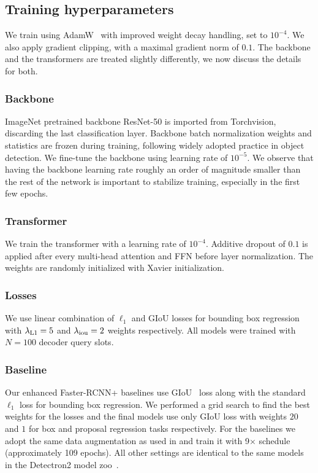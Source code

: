 \subsection{Training hyperparameters}
\label{sec:hyperparameters}
We train \detr using AdamW~\cite{Loshchilov2017DecoupledWD} with improved weight
decay handling, set to $10^{-4}$.
We also apply gradient clipping, with a maximal gradient norm of $0.1$.
The backbone and the transformers are treated slightly differently, we now discuss the details for both.
\subsubsection{Backbone}
ImageNet pretrained backbone ResNet-50 is imported from Torchvision, discarding the last classification layer.
Backbone batch normalization weights and statistics are frozen during training,
following widely adopted practice in object detection.
We fine-tune the backbone using learning rate of $10^{-5}$. We observe that having the backbone learning rate roughly an order of magnitude smaller than the rest of the network is important to stabilize training, especially in the first few epochs.
\subsubsection{Transformer}
We train the transformer with a learning rate of $10^{-4}$.
Additive dropout of $0.1$ is applied after every multi-head attention and FFN before layer normalization.
The weights are randomly initialized with Xavier initialization.
\subsubsection{Losses} We use linear combination of $\ell_1$ and GIoU losses for bounding box regression with $\lambda_{\rm L1} = 5$ and $\lambda_{\rm iou} = 2$ weights respectively. All models were trained with $N=100$ decoder query slots.
\subsubsection{Baseline} Our enhanced Faster-RCNN+ baselines use GIoU~\cite{Rezatofighi_2018_CVPR} loss along with the standard $\ell_1$ loss for bounding box regression. We performed a grid search to find the best weights for the losses and the final models use only GIoU loss with weights $20$ and $1$ for box and proposal regression tasks respectively. For the baselines we adopt the same data augmentation as used in \detr and train it with 9$\times$ schedule (approximately 109 epochs). All other settings are identical to the same models in the Detectron2 model zoo~\cite{wu2019detectron2}.

